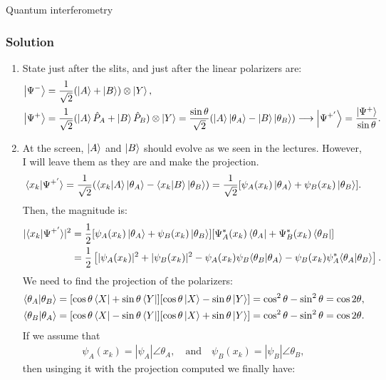 \begin{example}{Quantum interferometry}
\subsubsection{Solution}
\begin{enumerate}[itemsep=0pt,topsep=0pt,parsep=0pt,label=\alph*)]
  \item State just after the slits, and just after the linear polarizers are:
  \begin{align*}
    \left|\Psi^-\right\rangle&=\frac{1}{\sqrt{2}}(\left|A\right\rangle+\left|B\right\rangle)\otimes\left|Y\right\rangle,\\
    \left|\Psi^+\right\rangle&=\frac{1}{\sqrt{2}}(\left|A\right\rangle\hat{P}_A+\left|B\right\rangle\hat{P}_B)\otimes\left|Y\right\rangle=\frac{\sin\theta}{\sqrt{2}}(\left|A\right\rangle
    \left|\theta_A\right\rangle-\left|B\right\rangle\left|\theta_B\right\rangle)\longrightarrow\left|\Psi^{+'}\right\rangle=\frac{\left|\Psi^+\right\rangle}{\sin\theta}.
  \end{align*}
  \item At the screen, $\left|A\right\rangle$ and $\left|B\right\rangle$ should evolve as we seen in the lectures. However, I will leave them as they are and make the projection.
  \begin{align*}
    \langle x_k|\Psi^{+'}\rangle=\frac{1}{\sqrt{2}}(\langle x_k|A\rangle\left|\theta_A\right\rangle-\langle x_k|B\rangle\left|\theta_B\right\rangle)=\frac{1}{\sqrt{2}}[\psi_A(x_k)\left|\theta_A\right\rangle+
    \psi_B(x_k)\left|\theta_B\right\rangle].
  \end{align*}
  Then, the magnitude is:
  \begin{align*}
    |\langle x_k|\Psi^{+'}\rangle|^2&=\frac{1}{2}[\psi_A(x_k)\left|\theta_A\right\rangle+
    \psi_B(x_k)\left|\theta_B\right\rangle][\Psi^*_A(x_k)\left\langle\theta_A\right|+
    \Psi^*_B(x_k)\left\langle\theta_B\right|]\\
    &=\frac{1}{2}\left[|\psi_A(x_k)|^2+|\psi_B(x_k)|^2-\psi_A(x_k)\psi_B\langle\theta_B|\theta_A\rangle-\psi_B(x_k)\psi_A^*\langle\theta_A|\theta_B\rangle\right].
  \end{align*}
  We need to find the projection of the polarizers:
  \begin{align*}
    \langle\theta_A|\theta_B\rangle&=[\cos\theta\left\langle X\right|+\sin\theta\left\langle Y\right|][\cos\theta\left|X\right\rangle-\sin\theta\left|Y\right\rangle]=\cos^2\theta-\sin^2\theta=\cos2\theta,\\
    \langle\theta_B|\theta_A\rangle&=[\cos\theta\left\langle X\right|-\sin\theta\left\langle Y\right|][\cos\theta\left|X\right\rangle+\sin\theta\left|Y\right\rangle]=\cos^2\theta-\sin^2\theta=\cos2\theta.
  \end{align*}
  If we assume that 
  \begin{align*}
    \psi_A(x_k)=|\psi_A|\angle\theta_A,\quad\text{and}\quad\psi_B(x_k)=|\psi_B|\angle\theta_B,
  \end{align*}
  then usinging it with the projection computed we finally have:

\end{enumerate}
\end{example}
